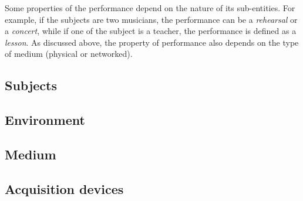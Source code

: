 Some properties of the performance depend on the nature of its sub-entities. For example, if the subjects are two musicians, the performance can be a \textit{rehearsal} or a \textit{concert}, while if one of the subject is a teacher, the performance is defined as a \textit{lesson}. As discussed above, the property of performance also depends on the type of medium (physical or networked).  



\subsection{Subjects}
\subsection{Environment}
\subsection{Medium}
\subsection{Acquisition devices}

